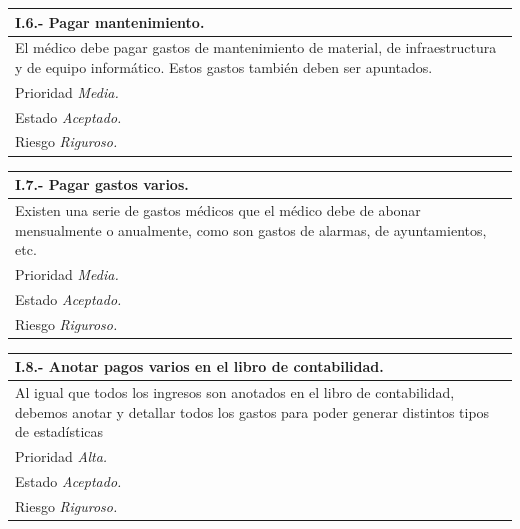 \documentclass[a4paper,oneside,11pt]{book}
\begin{document}
\begin{center}
\begin{tabulary}{15cm}{|L|}
	\hline
		\bf{I.6.- Pagar mantenimiento.} \\
	\hline
		El médico debe pagar gastos de mantenimiento de material, de infraestructura y de equipo informático. Estos gastos también deben ser apuntados. \\
	\hline
		Prioridad \textit{Media.} \\
	\hline
		Estado \textit{Aceptado.} \\
	\hline
		Riesgo \textit{Riguroso.} \\
	\hline
\end{tabulary}
\end{center}

\begin{center}
\begin{tabulary}{15cm}{|L|}
	\hline
		\bf{I.7.- Pagar gastos varios.} \\
	\hline
		Existen una serie de gastos médicos que el médico debe de abonar mensualmente o anualmente, como son gastos de alarmas, de ayuntamientos, etc. \\
	\hline
		Prioridad \textit{Media.} \\
	\hline
		Estado \textit{Aceptado.} \\
	\hline
		Riesgo \textit{Riguroso.} \\
	\hline
\end{tabulary}
\end{center}

\begin{center}
\begin{tabulary}{15cm}{|L|}
	\hline
		\bf{I.8.- Anotar pagos varios en el libro de contabilidad.} \\
	\hline
		Al igual que todos los ingresos son anotados en el libro de contabilidad, debemos anotar y detallar todos los gastos para poder generar distintos tipos de estadísticas\\
	\hline
		Prioridad \textit{Alta.} \\
	\hline
		Estado \textit{Aceptado.} \\
	\hline
		Riesgo \textit{Riguroso.} \\
	\hline
\end{tabulary}
\end{center}
\end{document}
